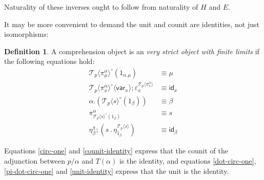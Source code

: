 \documentclass[10pt]{article}
\theoremstyle{definition}
\newtheorem{definition}{Definition}
\newcommand\var[1]{\ensuremath{\mathsf{var}_{#1}}}
\newcommand{\id}{\mathsf{id}}
\newcommand\ApEl[2]{\mathcal{T}_{#1}\langle#2\rangle}
\newcommand\ap[2]{\ensuremath{#1 \langle #2 \rangle }}
\newcommand\bdot[0]{\mathbin{.}}
\begin{document}
Naturality of these inverses ought to follow from naturality of $H$ and $E$.

It may be more convenient to demand the unit and counit are identities, not just isomorphisms:

\begin{definition}
  A comprehension object is an \emph{very strict object with finite limits} if the following equations hold:
  \begin{align}
\label{circ-one}
\ApEl{p}{\pi^\alpha_\mu}^\circ(1_{\alpha.\mu}) &\equiv \mu \\
\label{counit-identity}
\ap{\ApEl{p}{\pi^\alpha_x}^\circ}{\var{x}} ; \varepsilon^{\ApEl{p}{\pi^\alpha_x}}_x &\equiv \id_x \\
\label{dot-circ-one}
\alpha.(\ApEl{p}{s}^\circ(1_\beta)) &\equiv \beta \\
\label{pi-dot-circ-one}
\pi^\alpha_{\ApEl{p}{s}^\circ(1_\beta)} &\equiv s \\
\label{unit-identity}
\eta^\chi_\beta ; (s \bdot \eta^{\ApEl{p}{s}}_{1_\beta}) &\equiv \id_\beta
  \end{align}
\end{definition}
Equations \eqref{circ-one} and \eqref{counit-identity} express that the counit of the adjunction between $p/\alpha$ and $T(\alpha)$ is the identity, and equations \eqref{dot-circ-one}, \eqref{pi-dot-circ-one} and \eqref{unit-identity} express that the unit is the identity.
\end{document}
